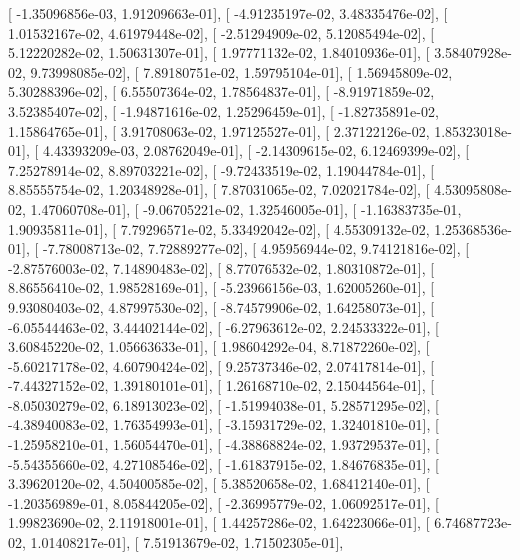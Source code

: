 \documentclass{article}
\begin{document}
       [ -1.35096856e-03,   1.91209663e-01],
       [ -4.91235197e-02,   3.48335476e-02],
       [  1.01532167e-02,   4.61979448e-02],
       [ -2.51294909e-02,   5.12085494e-02],
       [  5.12220282e-02,   1.50631307e-01],
       [  1.97771132e-02,   1.84010936e-01],
       [  3.58407928e-02,   9.73998085e-02],
       [  7.89180751e-02,   1.59795104e-01],
       [  1.56945809e-02,   5.30288396e-02],
       [  6.55507364e-02,   1.78564837e-01],
       [ -8.91971859e-02,   3.52385407e-02],
       [ -1.94871616e-02,   1.25296459e-01],
       [ -1.82735891e-02,   1.15864765e-01],
       [  3.91708063e-02,   1.97125527e-01],
       [  2.37122126e-02,   1.85323018e-01],
       [  4.43393209e-03,   2.08762049e-01],
       [ -2.14309615e-02,   6.12469399e-02],
       [  7.25278914e-02,   8.89703221e-02],
       [ -9.72433519e-02,   1.19044784e-01],
       [  8.85555754e-02,   1.20348928e-01],
       [  7.87031065e-02,   7.02021784e-02],
       [  4.53095808e-02,   1.47060708e-01],
       [ -9.06705221e-02,   1.32546005e-01],
       [ -1.16383735e-01,   1.90935811e-01],
       [  7.79296571e-02,   5.33492042e-02],
       [  4.55309132e-02,   1.25368536e-01],
       [ -7.78008713e-02,   7.72889277e-02],
       [  4.95956944e-02,   9.74121816e-02],
       [ -2.87576003e-02,   7.14890483e-02],
       [  8.77076532e-02,   1.80310872e-01],
       [  8.86556410e-02,   1.98528169e-01],
       [ -5.23966156e-03,   1.62005260e-01],
       [  9.93080403e-02,   4.87997530e-02],
       [ -8.74579906e-02,   1.64258073e-01],
       [ -6.05544463e-02,   3.44402144e-02],
       [ -6.27963612e-02,   2.24533322e-01],
       [  3.60845220e-02,   1.05663633e-01],
       [  1.98604292e-04,   8.71872260e-02],
       [ -5.60217178e-02,   4.60790424e-02],
       [  9.25737346e-02,   2.07417814e-01],
       [ -7.44327152e-02,   1.39180101e-01],
       [  1.26168710e-02,   2.15044564e-01],
       [ -8.05030279e-02,   6.18913023e-02],
       [ -1.51994038e-01,   5.28571295e-02],
       [ -4.38940083e-02,   1.76354993e-01],
       [ -3.15931729e-02,   1.32401810e-01],
       [ -1.25958210e-01,   1.56054470e-01],
       [ -4.38868824e-02,   1.93729537e-01],
       [ -5.54355660e-02,   4.27108546e-02],
       [ -1.61837915e-02,   1.84676835e-01],
       [  3.39620120e-02,   4.50400585e-02],
       [  5.38520658e-02,   1.68412140e-01],
       [ -1.20356989e-01,   8.05844205e-02],
       [ -2.36995779e-02,   1.06092517e-01],
       [  1.99823690e-02,   2.11918001e-01],
       [  1.44257286e-02,   1.64223066e-01],
       [  6.74687723e-02,   1.01408217e-01],
       [  7.51913679e-02,   1.71502305e-01],
\end{document}
